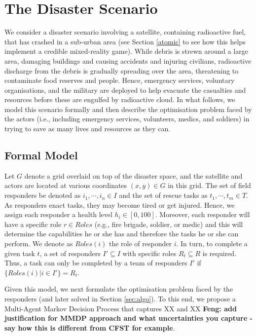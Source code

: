 \section{The Disaster Scenario}
\noindent We consider a disaster scenario involving a satellite, containing radioactive fuel, that has crashed in a sub-urban area (see Section \ref{atomic} to see how this helps implement a credible mixed-reality game). While debris is strewn around a large area, damaging buildings and causing accidents and injuring civilians, radioactive discharge from the debris is gradually spreading over the area, threatening to contaminate food reserves and people. Hence, emergency services, voluntary organisations, and the military are deployed to help evacuate the casualties and resources before these are engulfed by  radioactive cloud.  In what follows, we model this scenario formally and then describe the optimisation problem faced by the actors (i.e., including emergency services, volunteers, medics, and soldiers) in trying to save as many lives and resources as they can.

\subsection{Formal Model}
\noindent Let $G$ denote a grid overlaid on top of the disaster space, and the satellite and actors are located at various coordinates $(x,y) \in G$ in this grid. The set of field responders be denoted as $i_1, \cdots, i_n \in I$ and the set of rescue tasks as  $t_1,\cdots, t_m\in T$.  As responders enact tasks, they may become tired or get injured. Hence, we assign each responder  a health level $h_i\in [0,100]$. Moreover, each responder will have  a specific role  $r \in Roles$ (e.g., fire brigade, soldier, or medic) and this will determine the capabilities he or she has and therefore the tasks he or she can perform. We denote as $Roles(i)$ the role of responder $i$. In turn, to complete a given task $t$,  a set of responders $I' \subseteq I$ with specific roles $R_t \subseteq R$ is required. Thus, a task can only be completed by a team of responders $I'$ if $\{Roles(i) | i \in I'\} = R_t$. 

Given this model, we next formulate the optimisation problem faced by the responders (and later solved in Section \ref{sec:algo}). To this end, we propose a Multi-Agent Markov Decision Process that captures XX and XX \textbf{Feng: add justification for MMDP approach and what uncertainties you capture - say how this is different from CFST for example}.

